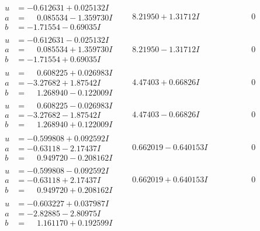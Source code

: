 \documentclass[1p]{elsarticle_modified}
\theoremstyle{definition}
\begin{document}
$$\begin{array}{c|c|c}
\begin{aligned}
u &= -0.612631 + 0.025132 I \\
a &= \phantom{-}0.085534 - 1.359730 I \\
b &= -1.71554 - 0.69035 I\end{aligned}
 & \phantom{-}8.21950 + 1.31712 I & \phantom{-0.000000 } 0 \\ \hline\begin{aligned}
u &= -0.612631 - 0.025132 I \\
a &= \phantom{-}0.085534 + 1.359730 I \\
b &= -1.71554 + 0.69035 I\end{aligned}
 & \phantom{-}8.21950 - 1.31712 I & \phantom{-0.000000 } 0 \\ \hline\begin{aligned}
u &= \phantom{-}0.608225 + 0.026983 I \\
a &= -3.27682 + 1.87542 I \\
b &= \phantom{-}1.268940 - 0.122009 I\end{aligned}
 & \phantom{-}4.47403 + 0.66826 I & \phantom{-0.000000 } 0 \\ \hline\begin{aligned}
u &= \phantom{-}0.608225 - 0.026983 I \\
a &= -3.27682 - 1.87542 I \\
b &= \phantom{-}1.268940 + 0.122009 I\end{aligned}
 & \phantom{-}4.47403 - 0.66826 I & \phantom{-0.000000 } 0 \\ \hline\begin{aligned}
u &= -0.599808 + 0.092592 I \\
a &= -0.63118 - 2.17437 I \\
b &= \phantom{-}0.949720 - 0.208162 I\end{aligned}
 & \phantom{-}0.662019 - 0.640153 I & \phantom{-0.000000 } 0 \\ \hline\begin{aligned}
u &= -0.599808 - 0.092592 I \\
a &= -0.63118 + 2.17437 I \\
b &= \phantom{-}0.949720 + 0.208162 I\end{aligned}
 & \phantom{-}0.662019 + 0.640153 I & \phantom{-0.000000 } 0 \\ \hline\begin{aligned}
u &= -0.603227 + 0.037987 I \\
a &= -2.82885 - 2.80975 I \\
b &= \phantom{-}1.161170 + 0.192599 I\end{aligned}

\end{array}$$
\end{document}
